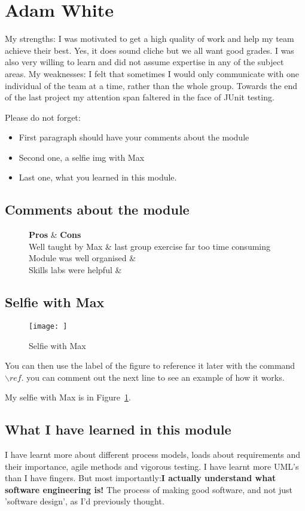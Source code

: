 \section{Adam White}
My strengths: I was motivated to get a high quality of work and help my team achieve their best. Yes, it does sound cliche but we all want good grades. I was 
also very willing to learn and did not assume expertise in any of the subject areas.
My weaknesses: I felt that sometimes I would only communicate with one individual of the team at a time, rather than the whole group. Towards the end of the last project my attention span faltered in the face of JUnit testing.

Please do not forget:
\begin{itemize}
	\item First paragraph should have your comments about the module
	\item Second one, a selfie img with Max
	\item Last one, what you learned in this module.
\end{itemize}

\subsection{Comments about the module}
\begin{figure}
	\begin{tabular}[|l | l|]
	\textbf{Pros} & \textbf{Cons} \\ \hline
	Well taught by Max & last group exercise far too time consuming \\ \hline
	Module was well organised & \\ \hline 
	Skills labs were helpful & \\ \hline
	\end{tabular}
\end{figure}

\subsection{Selfie with Max}

\begin{figure}[h]
\caption{Selfie with Max}
\centering
\texttt{[image: ]}
\label{fig:selfie}
\end{figure}

You can then use the label of the figure to reference it later with the command ${\backslash}ref$. you can comment out the next line to see an example of how it works.

My selfie with Max is in  Figure~\ref{fig:selfie}.

\subsection{What I have learned in this module}
I have learnt more about different process models, loads about requirements and their importance, agile methods and vigorous testing. I have learnt more UML's than I have fingers. But most importantly:\textbf{I actually understand what software engineering is!} The process of making good software, and not just 'software design', as I'd previously thought. 